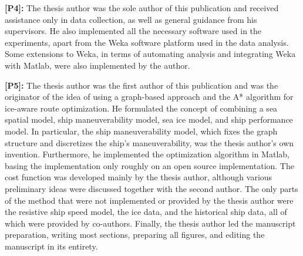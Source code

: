 \textbf{[P4]:} The thesis author was the sole author of this publication and received assistance only in data collection, as well as general guidance from his supervisors. He also implemented all the necessary software used in the experiments, apart from the Weka software platform used in the data analysis. Some extensions to Weka, in terms of automating analysis and integrating Weka with Matlab, were also implemented by the author.

\textbf{[P5]:} The thesis author was the first author of this publication and was the originator of the idea of using a graph-based approach and the A* algorithm for ice-aware route optimization. He formulated the concept of combining a sea spatial model, ship maneuverability model, sea ice model, and ship performance model. In particular, the ship maneuverability model, which fixes the graph structure and discretizes the ship's maneuverability, was the thesis author's own invention. Furthermore, he implemented the optimization algorithm in Matlab, basing the implementation only roughly on an open source implementation.  The cost function was developed mainly by the thesis author, although various preliminary ideas were discussed together with the second author. The only parts of the method that were not implemented or provided by the thesis author were the resistive ship speed model, the ice data, and the historical ship data, all of which were provided by co-authors. Finally, the thesis author led the manuscript preparation, writing most sections, preparing all figures, and editing the manuscript in its entirety.